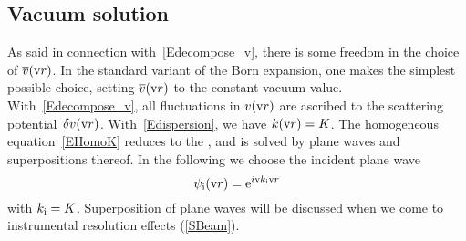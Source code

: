 \subsection{Vacuum solution}\label{Sfarfield}

%

As said in connection with~\cref{Edecompose_v},
there is some freedom in the choice of $\overline{v}(\text{v}{r})$.
In the standard variant of the Born expansion,
one makes the simplest possible choice,
setting $\overline{v}(\text{v}{r})$ to the constant vacuum value.
With~\cref{Edecompose_v},
all fluctuations in $v(\text{v}{r})$ are ascribed to the scattering potential~$\delta v(\text{v}{r})$.
With~\cref{Edispersion}, we have $k(\text{v}{r})=K$.
The homogeneous equation~\cref{EHomoK} reduces to the ,
%
%
and is solved by plane waves and superpositions thereof.
In the following we choose the incident plane wave
%
\begin{equation}\label{EPsi0Plane}
  \psi_{\text{i}}(\text{v}{r})=\mathrm e^{i \text{v}{k}_{\text{i}} \text{v}{r}}
\end{equation}
%
with $k_{\text{i}}=K$.
Superposition of plane waves
%
will be discussed when we come to instrumental resolution effects (\cref{SBeam}).
%
%

